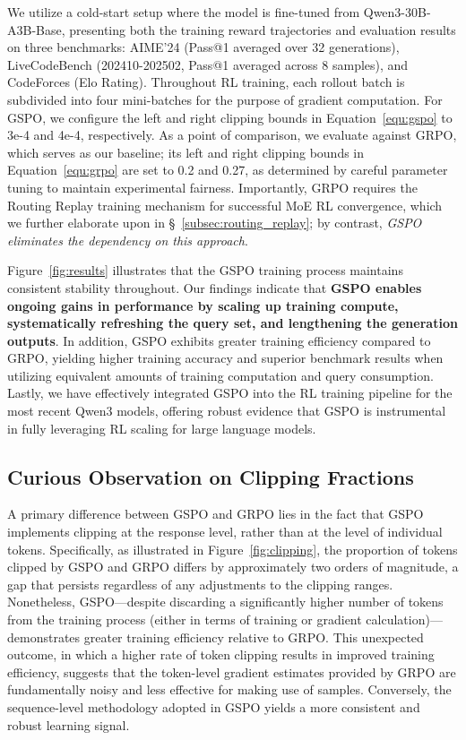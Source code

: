 We utilize a cold-start setup where the model is fine-tuned from Qwen3-30B-A3B-Base, presenting both the training reward trajectories and evaluation results on three benchmarks: AIME'24 (Pass@1 averaged over 32 generations), LiveCodeBench (202410-202502, Pass@1 averaged across 8 samples), and CodeForces (Elo Rating). Throughout RL training, each rollout batch is subdivided into four mini-batches for the purpose of gradient computation. For GSPO, we configure the left and right clipping bounds in Equation~\eqref{equ:gspo} to 3e-4 and 4e-4, respectively. As a point of comparison, we evaluate against GRPO, which serves as our baseline; its left and right clipping bounds in Equation~\eqref{equ:grpo} are set to 0.2 and 0.27, as determined by careful parameter tuning to maintain experimental fairness. Importantly, GRPO requires the Routing Replay training mechanism for successful MoE RL convergence, which we further elaborate upon in \S~\ref{subsec:routing_replay}; by contrast, \textit{GSPO eliminates the dependency on this approach}.

Figure~\ref{fig:results} illustrates that the GSPO training process maintains consistent stability throughout. Our findings indicate that \textbf{GSPO enables ongoing gains in performance by scaling up training compute, systematically refreshing the query set, and lengthening the generation outputs}. In addition, GSPO exhibits greater training efficiency compared to GRPO, yielding higher training accuracy and superior benchmark results when utilizing equivalent amounts of training computation and query consumption. Lastly, we have effectively integrated GSPO into the RL training pipeline for the most recent Qwen3 models, offering robust evidence that GSPO is instrumental in fully leveraging RL scaling for large language models.

\subsection{Curious Observation on Clipping Fractions}

A primary difference between GSPO and GRPO lies in the fact that GSPO implements clipping at the response level, rather than at the level of individual tokens. Specifically, as illustrated in Figure~\ref{fig:clipping}, the proportion of tokens clipped by GSPO and GRPO differs by approximately two orders of magnitude, a gap that persists regardless of any adjustments to the clipping ranges. Nonetheless, GSPO—despite discarding a significantly higher number of tokens from the training process (either in terms of training or gradient calculation)—demonstrates greater training efficiency relative to GRPO. This unexpected outcome, in which a higher rate of token clipping results in improved training efficiency, suggests that the token-level gradient estimates provided by GRPO are fundamentally noisy and less effective for making use of samples. Conversely, the sequence-level methodology adopted in GSPO yields a more consistent and robust learning signal.

